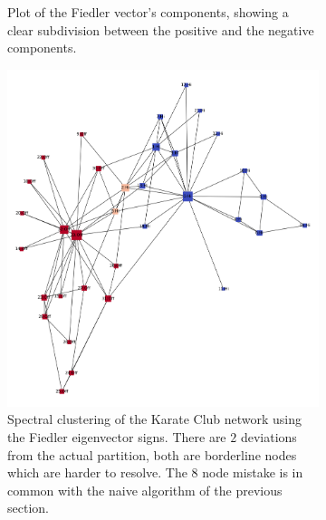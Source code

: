 \documentclass[a4paper,10pt]{article}
\theoremstyle{definition}
\theoremstyle{remark}
\theoremstyle{plain}
\begin{document}
\begin{figure}
\begin{subfigure}[b]{0.5\textwidth}
\caption{Plot of the Fiedler vector's components, showing a clear subdivision
between the positive and the negative components.}
\label{fig:toygraphfiedlerplot}
\end{subfigure}
\caption{}
\end{figure}

\begin{figure}
\centering
\begin{subfigure}[b]{0.5\textwidth}
\includegraphics[width=\textwidth]{Karate_spectralT2clustering.png}
\caption{Spectral clustering of the Karate Club network using the Fiedler
eigenvector signs. There are $2$ deviations from the actual partition, both are
borderline nodes which are harder to resolve. The $8$ node mistake is in common
with the naive algorithm of the previous section.}
\label{fig:karatespectral}
\end{subfigure}
\begin{subfigure}[b]{0.5\textwidth}

\end{subfigure}
\end{figure}
\end{document}
